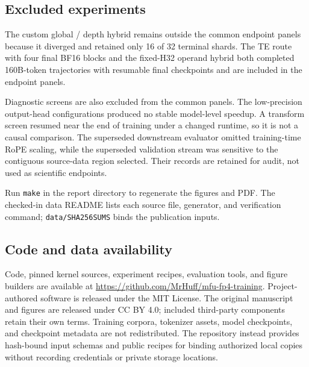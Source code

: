 \subsection{Excluded experiments}

The custom global \nvfp{}/\mxfp{} depth hybrid remains outside the common endpoint panels because
it diverged and retained only 16 of 32 terminal shards. The TE route with four
final BF16 blocks and the fixed-H32 operand hybrid both completed 160B-token
trajectories with resumable final checkpoints and are included in the endpoint
panels.

Diagnostic screens are also excluded from the common panels. The
low-precision output-head configurations produced no stable model-level
speedup. A \localcta{} transform screen resumed near the end of training under
a changed runtime, so it is not a causal comparison. The superseded downstream
evaluator omitted training-time RoPE scaling, while the superseded validation
stream was sensitive to the contiguous source-data region selected. Their
records are retained for audit, not used as scientific endpoints.

Run \texttt{make} in the report directory to regenerate the figures and PDF.
The checked-in data README lists each source file, generator, and verification
command; \texttt{data/SHA256SUMS} binds the publication inputs.

\subsection{Code and data availability}
\label{app:code-release}

Code, pinned kernel sources, experiment recipes, evaluation tools, and figure
builders are available at
\url{https://github.com/MrHuff/mfu-fp4-training}. Project-authored software is
released under the MIT License. The original manuscript and figures are
released under CC BY 4.0; included third-party components retain their own
terms. Training corpora, tokenizer assets, model checkpoints, and checkpoint
metadata are not redistributed. The repository instead provides hash-bound
input schemas and public recipes for binding authorized local copies without
recording credentials or private storage locations.
